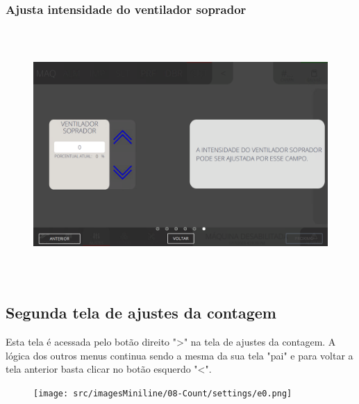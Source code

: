 \newpage
\thispagestyle{fancy}
\vspace*{40 pt}
\subsubsection{\small{Ajusta intensidade do ventilador soprador}}\label{miniTelaAjustesContagemAjustaIntensidadeVentiladorSoprador}
\vspace*{\fill}
\begin{figure}[h]
  \centering
  \includegraphics[width=576px,height=360px]{src/imagesFlexo/08-count/settings/e-6.png}
\end{figure}
\vspace*{\fill}

\newpage
\thispagestyle{fancy}
\vspace*{40 pt}
\subsection{Segunda tela de ajustes da contagem}\label{miniTelaAjustesContagemSegundaTela}
Esta tela é acessada pelo botão direito "\textgreater" na tela de ajustes da contagem. A lógica dos outros menus continua sendo a mesma da sua tela "pai" e para voltar a tela anterior basta clicar no botão esquerdo "\textless{}".
\vspace*{\fill}
\begin{figure}[h]
  \centering
  \texttt{[image: src/imagesMiniline/08-Count/settings/e0.png]}
\end{figure}
\vspace*{\fill}

\newpage
\thispagestyle{fancy}
\vspace*{40 pt}
